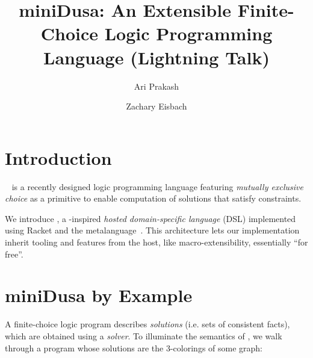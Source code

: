 \documentclass[dvipsnames,sigplan,screen,review,anonymous,acmthm,nonacm]{acmart}
\begin{document}
\title{miniDusa: An Extensible Finite-Choice Logic Programming Language (Lightning Talk)}



\author{Ari Prakash}


\author{Zachary Eisbach}
\authornotemark[1]


\maketitle

\section{Introduction}

\Dusa{}~\cite{martens2025dusa} %
is a recently designed logic programming language featuring
\emph{mutually exclusive choice} as a primitive to enable
computation of solutions that satisfy constraints.


We introduce \miniDusa{}, a \Dusa{}-inspired
\emph{hosted domain-specific language} (DSL) implemented using Racket and
the \syntaxspec{} metalanguage~\cite{ballantyne2024pearl}. %
This architecture lets our implementation inherit tooling and features
from the host, like macro-extensibility, essentially ``for free''.


\section{miniDusa by Example}

A finite-choice logic program describes \emph{solutions}
(i.e. sets of consistent facts), which are obtained using a \emph{solver}.
To illuminate the semantics of \miniDusa{}, we walk through
a program whose solutions are the 3-colorings of some graph:
\end{document}
